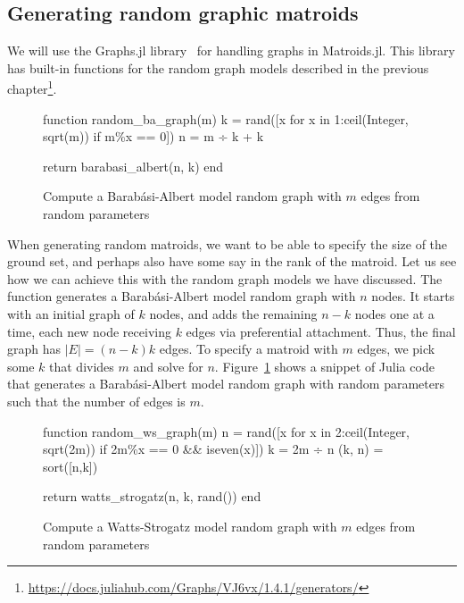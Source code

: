\subsection{Generating random graphic matroids}
We will use the Graphs.jl library~\cite{Graphs2021} for handling graphs in Matroids.jl. This library has built-in functions for the random graph models described in the previous chapter\footnote{\href{https://docs.juliahub.com/Graphs/VJ6vx/1.4.1/generators/}{https://docs.juliahub.com/Graphs/VJ6vx/1.4.1/generators/}}. 
\begin{figure}[ht!]
  \begin{jllisting}
    
function random_ba_graph(m)
  k = rand([x for x in 1:ceil(Integer, sqrt(m)) if m\%x == 0])
  n = m ÷ k + k

  return barabasi_albert(n, k)
end

  \end{jllisting}
  \caption{Compute a Barabási-Albert model random graph with $m$ edges from random parameters}
  \label{code:random_ba_graph}
\end{figure}

When generating random matroids, we want to be able to specify the size of the ground set, and perhaps also have some say in the rank of the matroid. Let us see how we can achieve this with the random graph models we have discussed. The function  generates a Barabási-Albert model random graph with $n$ nodes. It starts with an initial graph of $k$ nodes, and adds the remaining $n-k$ nodes one at a time, each new node receiving $k$ edges via preferential attachment. Thus, the final graph has $|E| = (n-k)k$ edges. To specify a matroid with $m$ edges, we pick some $k$ that divides $m$ and solve for $n$. Figure~\ref{code:random_ba_graph} shows a snippet of Julia code that generates a Barabási-Albert model random graph with random parameters such that the number of edges is $m$.

\begin{figure}[ht!]
  \begin{jllisting}
    
function random_ws_graph(m)
  n = rand([x for x in 2:ceil(Integer, sqrt(2m)) if 2m\%x == 0 && iseven(x)])
  k = 2m ÷ n
  (k, n) = sort([n,k])

  return watts_strogatz(n, k, rand())
end

  \end{jllisting}
  \caption{Compute a Watts-Strogatz model random graph with $m$ edges from random parameters}
  \label{code:random_ws_graph}
\end{figure}

